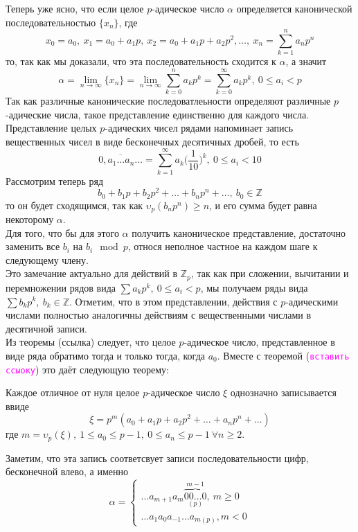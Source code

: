 \documentclass[11pt]{article}
\begin{document}
    Теперь уже ясно, что если целое $p$-адическое число $\alpha$ определяется канонической последовательностью $\{ x_n \}$, где
    \[ x_0 = a_0, \ x_1 = a_0 + a_1 p, \ x_2 = a_0 + a_1 p + a_2 p^2, \ldots, \ x_n = \sum\limits_{k = 1}^{n} a_n p^n \]
    то, так как мы доказали, что эта последовательность сходится к $\alpha$, а значит
    \[ \alpha = \lim\limits_{n \to \infty} \{ x_n \} = \lim\limits_{n \to \infty} \sum\limits_{k = 0}^{n} a_k p^k = \sum\limits_{k = 0}^{\infty} a_k p^k, \ 0 \le a_i < p \]
    Так как различные канонические последоватлеьности определяют различные $p$-адические числа, такое представление единственно для каждого числа.
    Представление целых $p$-адических чисел рядами напоминает запись вещественных чисел в виде бесконечных десятичных дробей, то есть
    \[ \overline{0, a_1 \ldots a_n \ldots } = \sum\limits_{k = 1}^{\infty} a_k \bigg(\frac{1}{10}\bigg)^k, \ 0 \le a_i < 10 \]
    Рассмотрим теперь ряд
    \[  b_0 + b_1 p + b_2 p^2 + \ldots + b_n p^n + \ldots, \ b_0 \in \mathbb{Z} \]
    то он будет сходящимся, так как $ \upsilon_p{(b_n p^n)} \ge n$, и его сумма будет равна некоторому $\alpha$.\\

    Для того, что бы для этого $\alpha$ получить каноническое представление, достаточно заменить все $b_i$ на $b_i \mod p$, относя неполное частное на каждом шаге к следующему
    члену. \\

    Это замечание актуально для действий в $\mathbb{Z}_p$, так как при сложении, вычитании и перемножении рядов вида $\sum a_k p^k, \ 0 \le a_i < p$, мы получаем ряды
    вида $\sum b_k p^k, \ b_k \in \mathbb{Z}$.
    Отметим, что в этом представлении, действия с $p$-адическими числами полностью аналогичны действиям с вещественными числами в десятичной записи.\\

    Из теоремы (ссылка) следует, что целое  $p$-адическое число, представленное в виде ряда обратимо тогда и только тогда, когда $a_0$. Вместе с теоремой (\textcolor{magenta}{\texttt{вставить ссыоку}})
    это даёт следующую теорему:

    \begin{theorem}
        Каждое отличное от нуля целое $p$-адическое число $\xi$ однозначно записывается ввиде
        \[ \xi = p^m(a_0 + a_1 p + a_2 p^2 + \ldots + a_n p^n + \ldots) \]
        где $m = \upsilon_p{(\xi)}, \ 1 \le a_0 \le p - 1, \ 0 \le a_n \le p - 1 \ \forall n \ge 2$.
    \end{theorem}
    Заметим, что эта запись соответсвует записи последовательности цифр, бесконечной влево, а именно
    \[ \alpha = \begin{cases}  \ldots a_{m + 1} a_m \overbrace{00\ldots0}^{m - 1}_{(p)}, \ m \ge 0 \\
        \ldots a_1 a_0 a_{-1} \ldots a_{m(p)}, m < 0 \end{cases}\]
\end{document}
